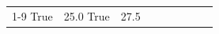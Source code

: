 \begin{table}[H]
\begin{tabular}{lllrlllll}
\cline{1-9}
True & 25.0%
\cline{1-9}
True & 27.5%

\end{tabular}
\end{table}
